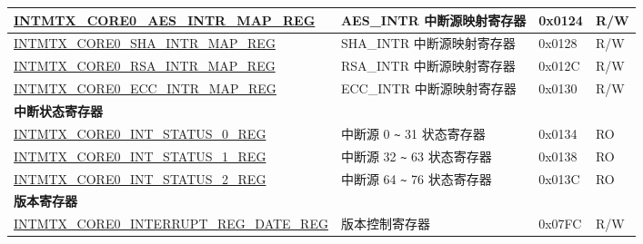 \begin{longtable}{ | p{10cm} | m{10cm} | m{1.3cm} | m{1.0cm} | }
\hyperref[regdesc:INTMTXCORE0AESINTRMAPREG]{INTMTX\_CORE0\_AES\_INTR\_MAP\_REG} & AES\_INTR 中断源映射寄存器 & 0x0124 & R/W \\ \hline
\hyperref[regdesc:INTMTXCORE0SHAINTRMAPREG]{INTMTX\_CORE0\_SHA\_INTR\_MAP\_REG} & SHA\_INTR 中断源映射寄存器 & 0x0128 & R/W \\ \hline
\hyperref[regdesc:INTMTXCORE0RSAINTRMAPREG]{INTMTX\_CORE0\_RSA\_INTR\_MAP\_REG} & RSA\_INTR 中断源映射寄存器 & 0x012C & R/W \\ \hline
\hyperref[regdesc:INTMTXCORE0ECCINTRMAPREG]{INTMTX\_CORE0\_ECC\_INTR\_MAP\_REG} & ECC\_INTR 中断源映射寄存器 & 0x0130 & R/W \\ \hline
\multicolumn{4}{|l|}{\textbf{中断状态寄存器}} \\ \hline
\hyperref[regdesc:INTMTXCORE0INTSTATUS0REG]{INTMTX\_CORE0\_INT\_STATUS\_0\_REG} & 中断源 0 \verb+~+ 31 状态寄存器 & 0x0134 & RO \\ \hline
\hyperref[regdesc:INTMTXCORE0INTSTATUS1REG]{INTMTX\_CORE0\_INT\_STATUS\_1\_REG} & 中断源 32 \verb+~+ 63 状态寄存器 & 0x0138 & RO \\ \hline
\hyperref[regdesc:INTMTXCORE0INTSTATUS2REG]{INTMTX\_CORE0\_INT\_STATUS\_2\_REG} & 中断源 64 \verb+~+ 76 状态寄存器 & 0x013C & RO \\ \hline
\multicolumn{4}{|l|}{\textbf{版本寄存器}} \\ \hline
\hyperref[regdesc:INTMTXCORE0INTERRUPTREGDATEREG]{INTMTX\_CORE0\_INTERRUPT\_REG\_DATE\_REG} & 版本控制寄存器 & 0x07FC & R/W \\ \hline
\end{longtable}

